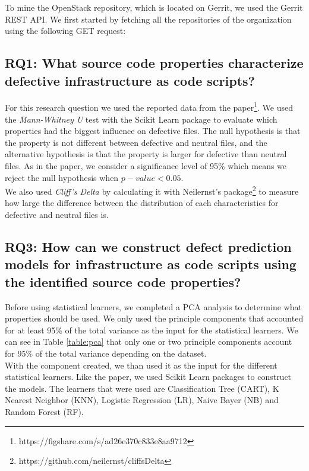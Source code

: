 To mine the OpenStack repository, which is located on Gerrit, we used the Gerrit REST API. We first started by fetching all the repositories of the organization using the following GET request:

\subsection{RQ1: What source code properties characterize defective infrastructure as code scripts?}
For this research question we used the reported data from the
paper\footnote{https://figshare.com/s/ad26e370c833e8aa9712}.
We used the \emph{Mann-Whitney U} test with the Scikit Learn package
to evaluate which properties had the biggest influence on defective files.
The null hypothesis is that the property is not different between defective and
neutral files, and the alternative hypothesis is that the property is larger for
defective than neutral files. As in the paper, we consider a significance level of
95\% which means we reject the null hypothesis when $ p-value < 0.05 $. \\

We also used \emph{Cliff's Delta} by calculating it with Neilernst's package\footnote{https://github.com/neilernst/cliffsDelta}
to measure how large the difference between the distribution of each characteristics
for defective and neutral files is.

\subsection{RQ3: How can we construct defect prediction models for 
infrastructure as code scripts using the identified source code properties?}
Before using statistical learners, we completed a PCA analysis to determine 
what properties should be used. We only used the principle components that accounted
for at least 95\% of the total variance as the input for the statistical learners.
We can see in Table \ref{table:pca} that only one or two principle components
account for 95\% of the total variance depending on the dataset. \\

With the component created, we than used it as the input for the different
statistical learners. Like the paper, we used Scikit Learn packages to construct
the models. The learners that were used are Classification Tree (CART),
K Nearest Neighbor (KNN), Logistic Regression (LR), Naive Bayer (NB) and
Random Forest (RF). \\

